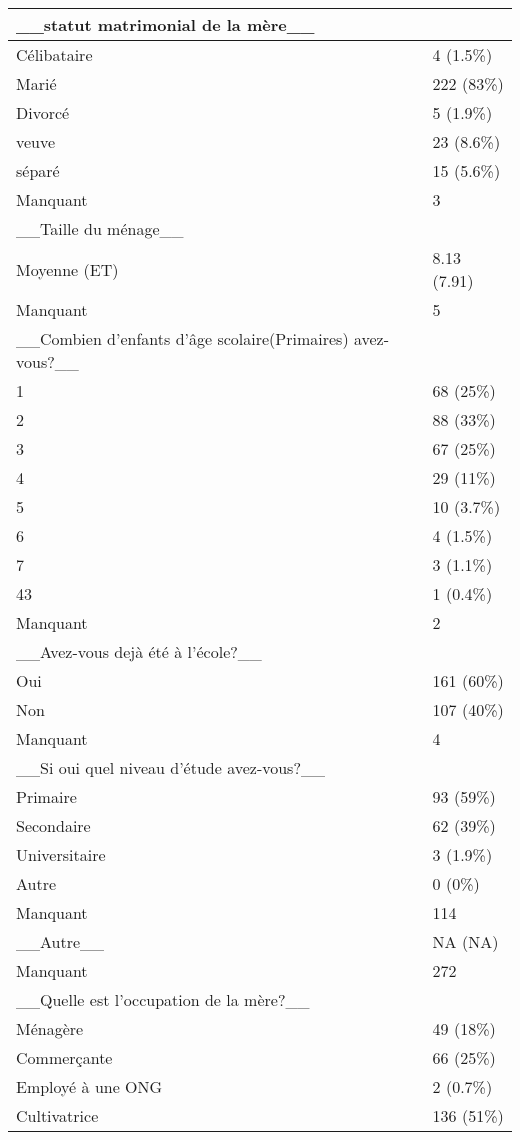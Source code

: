 \documentclass[
]{book}
\begin{document}
\begin{tabular}{l|l}
\hline
\_\_statut matrimonial de la mère\_\_ & \\
\hline
Célibataire & 4 (1.5\%)\\
\hline
Marié & 222 (83\%)\\
\hline
Divorcé & 5 (1.9\%)\\
\hline
veuve & 23 (8.6\%)\\
\hline
séparé & 15 (5.6\%)\\
\hline
Manquant & 3\\
\hline
\_\_Taille du ménage\_\_ & \\
\hline
Moyenne  (ET) & 8.13  (7.91)\\
\hline
Manquant & 5\\
\hline
\_\_Combien d'enfants d'âge scolaire(Primaires) avez-vous?\_\_ & \\
\hline
1 & 68 (25\%)\\
\hline
2 & 88 (33\%)\\
\hline
3 & 67 (25\%)\\
\hline
4 & 29 (11\%)\\
\hline
5 & 10 (3.7\%)\\
\hline
6 & 4 (1.5\%)\\
\hline
7 & 3 (1.1\%)\\
\hline
43 & 1 (0.4\%)\\
\hline
Manquant & 2\\
\hline
\_\_Avez-vous dejà été à l'école?\_\_ & \\
\hline
Oui & 161 (60\%)\\
\hline
Non & 107 (40\%)\\
\hline
Manquant & 4\\
\hline
\_\_Si oui quel niveau d'étude avez-vous?\_\_ & \\
\hline
Primaire & 93 (59\%)\\
\hline
Secondaire & 62 (39\%)\\
\hline
Universitaire & 3 (1.9\%)\\
\hline
Autre & 0 (0\%)\\
\hline
Manquant & 114\\
\hline
\_\_Autre\_\_ & NA  (NA)\\
\hline
Manquant & 272\\
\hline
\_\_Quelle est l'occupation de la mère?\_\_ & \\
\hline
Ménagère & 49 (18\%)\\
\hline
Commerçante & 66 (25\%)\\
\hline
Employé à une ONG & 2 (0.7\%)\\
\hline
Cultivatrice & 136 (51\%)\\

\end{tabular}
\end{document}
